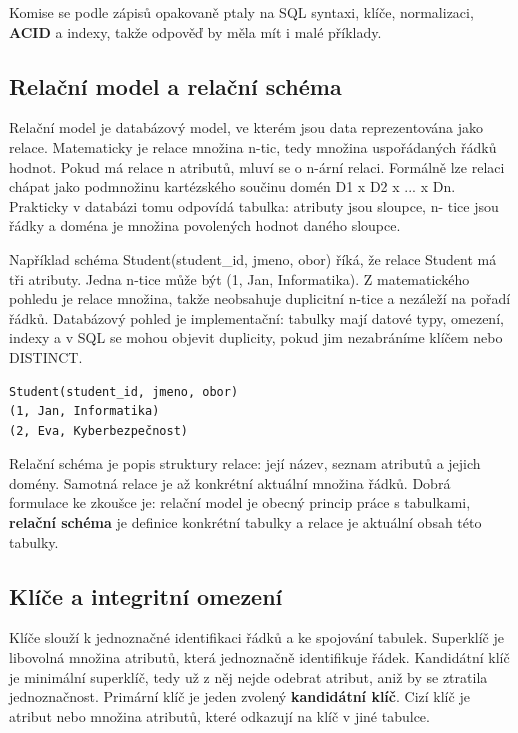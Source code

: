 \documentclass[11pt,a4paper]{article}
\begin{document}
Komise se podle zápisů opakovaně ptaly na SQL syntaxi, klíče, normalizaci, \textbf{ACID} a indexy, takže odpověď by měla mít i malé příklady.

\subsection*{Relační model a relační schéma}

Relační model je databázový model, ve kterém jsou data reprezentována jako relace. Matematicky je relace množina n-tic, tedy množina uspořádaných řádků hodnot. Pokud má relace n atributů, mluví se o n-ární relaci. Formálně lze relaci chápat jako podmnožinu kartézského součinu domén D1 x D2 x ... x Dn. Prakticky v databázi tomu odpovídá tabulka: atributy jsou sloupce, n- tice jsou řádky a doména je množina povolených hodnot daného sloupce.

Například schéma Student(student\_id, jmeno, obor) říká, že relace Student má tři atributy. Jedna n-tice může být (1, Jan, Informatika). Z matematického pohledu je relace množina, takže neobsahuje duplicitní n-tice a nezáleží na pořadí řádků. Databázový pohled je implementační: tabulky mají datové typy, omezení, indexy a v SQL se mohou objevit duplicity, pokud jim nezabráníme klíčem nebo DISTINCT.

\begin{codebox}
\small
\begin{verbatim}
Student(student_id, jmeno, obor)
(1, Jan, Informatika)
(2, Eva, Kyberbezpečnost)
\end{verbatim}
\end{codebox}

Relační schéma je popis struktury relace: její název, seznam atributů a jejich domény. Samotná relace je až konkrétní aktuální množina řádků. Dobrá formulace ke zkoušce je: relační model je obecný princip práce s tabulkami, \textbf{relační schéma} je definice konkrétní tabulky a relace je aktuální obsah této tabulky.

\subsection*{Klíče a integritní omezení}

Klíče slouží k jednoznačné identifikaci řádků a ke spojování tabulek. Superklíč je libovolná množina atributů, která jednoznačně identifikuje řádek. Kandidátní klíč je minimální superklíč, tedy už z něj nejde odebrat atribut, aniž by se ztratila jednoznačnost. Primární klíč je jeden zvolený \textbf{kandidátní klíč}. Cizí klíč je atribut nebo množina atributů, které odkazují na klíč v jiné tabulce.
\end{document}
